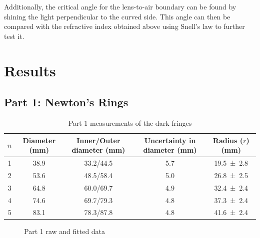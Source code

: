 \documentclass[a4paper]{scrartcl}
\begin{document}
Additionally, the critical angle for the lens-to-air boundary can be found by shining the light perpendicular to the curved side. This angle can then be compared with the refractive index obtained above using Snell's law to further test it.

\section{Results}
\subsection{Part 1: Newton's Rings}
\begin{table}
    \centering
    \begin{tabular}{c | c | c | c | c}
        \(n\) & Diameter (\si{\milli\metre}) & Inner/Outer diameter (\si{\milli\metre}) & Uncertainty in diameter (\si{\milli\metre}) & Radius (\(r\)) (\si{\milli\metre}) \\
        \hline
        1 & 38.9 & 33.2/44.5 & 5.7 & \SI{19.5 \pm 2.8}{} \\
        2 & 53.6 & 48.5/58.4 & 5.0 & \SI{26.8 \pm 2.5}{} \\
        3 & 64.8 & 60.0/69.7 & 4.9 & \SI{32.4 \pm 2.4}{} \\
        4 & 74.6 & 69.7/79.3 & 4.8 & \SI{37.3 \pm 2.4}{} \\
        5 & 83.1 & 78.3/87.8 & 4.8 & \SI{41.6 \pm 2.4}{} \\
        \hline
    \end{tabular}
    \caption{Part 1 measurements of the dark fringes}
    \label{tab:part1_data}
\end{table}

\begin{figure}
    \centering
    \caption{Part 1 raw and fitted data}
    \label{fig:part1_graph}
\end{figure}
\end{document}
